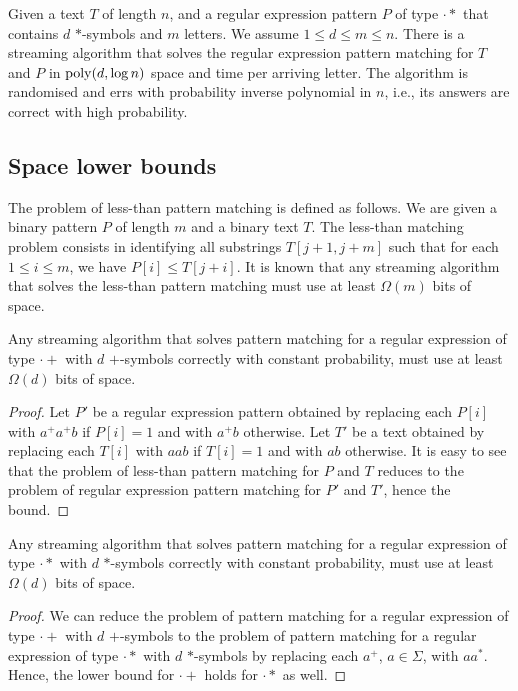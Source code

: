 \documentclass{article}
\begin{document}
\begin{corollary}
Given a text $T$ of length $n$, and a regular expression pattern $P$ of type $\cdot*$ that contains $d$ $*$-symbols and $m$ letters. We assume $1 \leq d \leq m \leq n$. There is a streaming algorithm that solves the regular expression pattern matching for $T$ and $P$ in $\mathrm{poly}(d, \log n)$ space and time per arriving letter. The  algorithm  is  randomised  and  errs  with  probability inverse polynomial in $n$, i.e., its answers are correct with high probability.
\end{corollary}

\subsection{Space lower bounds}
The problem of less-than pattern matching is defined as follows. We are given a binary pattern $P$ of length $m$ and a binary text $T$. The less-than matching problem consists in identifying all substrings $T[j+1, j+m]$ such that for each $1\le i \le m$, we have $P[i] \le T[j+i]$. It is known that any streaming algorithm that solves the less-than pattern matching must use at least $\Omega(m)$ bits of space.


\begin{lemma}
Any streaming algorithm that solves pattern matching for a regular expression of type $\cdot +$ with $d$ $+$-symbols correctly with constant probability, must use at least $\Omega(d)$ bits of space.
\end{lemma}
\begin{proof}
Let $P'$ be a regular expression pattern obtained by replacing each $P[i]$ with $a^+ a^+ b$ if $P[i] = 1$ and with $a^+ b$ otherwise. Let $T'$ be a text obtained by replacing each $T[i]$ with $aab$ if $T[i] = 1$ and with $ab$ otherwise. It is easy to see that the problem of less-than pattern matching for $P$ and $T$ reduces to the problem of regular expression pattern matching for $P'$ and $T'$, hence the bound.  
\end{proof}

\begin{corollary}
Any streaming algorithm that solves pattern matching for a regular expression of type $\cdot *$ with $d$ $*$-symbols correctly with constant probability, must use at least $\Omega(d)$ bits of space.
\end{corollary}
\begin{proof}
We can reduce the problem of pattern matching for a regular expression of type $\cdot +$ with $d$ $+$-symbols to the problem of pattern matching for a regular expression of type $\cdot *$ with $d$ $*$-symbols by replacing each $a^+$, $a \in \Sigma$, with $a a^*$. Hence, the lower bound for $\cdot +$ holds for $\cdot *$ as well.
\end{proof}
\end{document}
